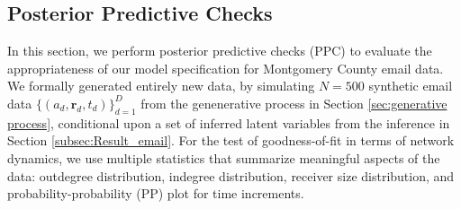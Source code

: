 \documentclass[ba]{imsart}
\def\spacingset#1{\renewcommand{\baselinestretch}%
	{#1}\small\normalsize} \spacingset{1}
\numberwithin{equation}{section}
\theoremstyle{plain}
\begin{document}
	\subsection{Posterior Predictive Checks}\label{subsec:PPC_email} 	   
In this section, we perform posterior predictive checks (PPC) \citep{rubin1984bayesianly} to evaluate the appropriateness of our model specification for Montgomery County email data. We formally generated entirely new data, by simulating $N=500$ synthetic email data $\{(a_{d}, \boldsymbol{r}_{d}, t_{d})\}_{d=1}^D$ from the genenerative process in Section \ref{sec:generative process}, conditional upon a set of inferred latent variables from the inference in Section \ref{subsec:Result_email}. For the test of goodness-of-fit in terms of network dynamics, we use multiple statistics that summarize meaningful aspects of the data: outdegree distribution, indegree distribution, receiver size distribution, and probability-probability (PP) plot for time increments. 

		
\end{document}
